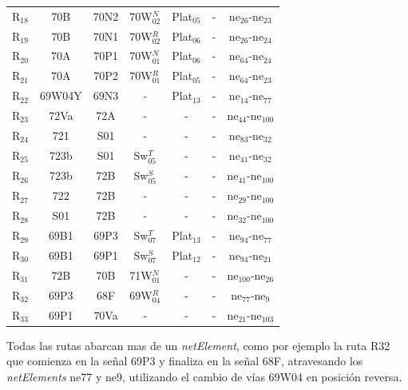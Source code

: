 \begin{table}[H]
{{\begin{tabular}{ c c c c c c c }
                    R$_{18}$ & 70B & 70N2 & 70W$_{02}^{N}$ & Plat$_{05}$ & - & ne$_{26}$-ne$_{23}$\\
                    R$_{19}$ & 70B & 70N1 & 70W$_{02}^{R}$ & Plat$_{06}$ & - & ne$_{26}$-ne$_{24}$\\
                    R$_{20}$ & 70A & 70P1 & 70W$_{01}^{N}$ & Plat$_{06}$ & - & ne$_{64}$-ne$_{24}$\\
                    R$_{21}$ & 70A & 70P2 & 70W$_{01}^{R}$ & Plat$_{05}$ & - & ne$_{64}$-ne$_{23}$\\
                    R$_{22}$ & 69W04Y & 69N3 & - & Plat$_{13}$ & - & ne$_{14}$-ne$_{77}$\\
                    R$_{23}$ & 72Va & 72A & - & - & - & ne$_{44}$-ne$_{100}$\\
                    R$_{24}$ & 721 & S01 & - & - & - & ne$_{83}$-ne$_{32}$\\
                    R$_{25}$ & 723b & S01 & Sw$_{05}^{T}$ & - & - & ne$_{41}$-ne$_{32}$\\
                    R$_{26}$ & 723b & 72B & Sw$_{05}^{S}$ & - & - & ne$_{41}$-ne$_{100}$\\
                    R$_{27}$ & 722 & 72B & - & - & - & ne$_{29}$-ne$_{100}$\\
                    R$_{28}$ & S01 & 72B & - & - & - & ne$_{32}$-ne$_{100}$\\
                    R$_{29}$ & 69B1 & 69P3 & Sw$_{07}^{T}$ & Plat$_{13}$ & - & ne$_{94}$-ne$_{77}$\\
                    R$_{30}$ & 69B1 & 69P1 & Sw$_{07}^{S}$ & Plat$_{12}$ & - & ne$_{94}$-ne$_{21}$\\
                    R$_{31}$ & 72B & 70B & 71W$_{01}^{N}$ & - & - & ne$_{100}$-ne$_{26}$\\
                    R$_{32}$ & 69P3 & 68F & 69W$_{04}^{R}$ & - & - & ne$_{77}$-ne$_{9}$\\
                    R$_{33}$ & 69P1 & 70Va & - & - & - & ne$_{21}$-ne$_{103}$\\
                \hline
            \end{tabular}
        }
     }
    \end{table}
    
    Todas las rutas abarcan mas de un \textit{netElement}, como por ejemplo la ruta R32 que comienza en la señal 69P3 y finaliza en la señal 68F, atravesando los \textit{netElements} ne77 y ne9, utilizando el cambio de vías 69W04 en posición reversa.